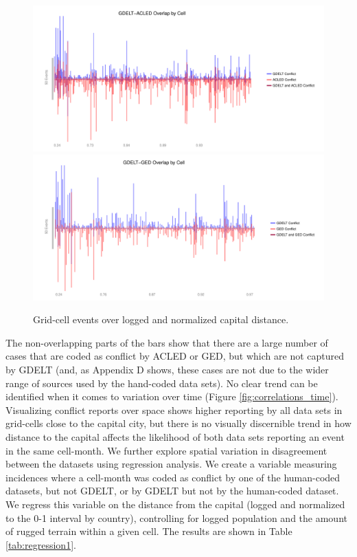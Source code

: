 \documentclass[hidelinks]{article}
\begin{document}
\begin{figure}[!htbp]
\includegraphics[width = 1 \textwidth]{spaceACLED.pdf}\\
\includegraphics[width = 1 \textwidth]{spaceGED.pdf}
\caption{Grid-cell events over logged and normalized capital distance.}\label{fig:correlations_space}
\end{figure}

The non-overlapping parts of the bars show that there are a large number of cases that are coded as conflict by ACLED or GED, but which are not captured by GDELT (and, as Appendix D shows, these cases are not due to the wider range of sources used by the hand-coded data sets). No clear trend can be identified when it comes to variation over time (Figure \ref{fig:correlations_time}). Visualizing conflict reports over space shows higher reporting by all data sets in grid-cells close to the capital city, but there is no visually discernible trend in how distance to the capital affects the likelihood of both data sets reporting an event in the same cell-month. We further explore spatial variation in disagreement between the datasets using regression analysis. We create a variable measuring incidences where a cell-month was coded as conflict by one of the human-coded datasets, but not GDELT, or by GDELT but not by the human-coded dataset. We regress this variable on the distance from the capital (logged and normalized to the 0-1 interval by country), controlling for logged population and the amount of rugged terrain within a given cell. The results are shown in Table \ref{tab:regression1}.
\end{document}

